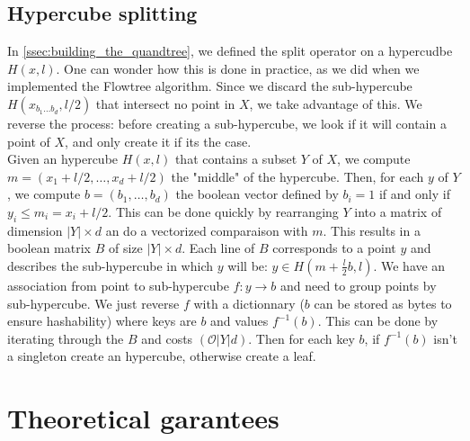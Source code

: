 \documentclass[11pt]{article}
\begin{document}
\subsection{Hypercube splitting}
In \ref{ssec:building_the_quandtree}, we defined the split operator on a hypercudbe $H(x, l)$. One can wonder how this is done in practice, as we did when we implemented the Flowtree algorithm. Since we discard the sub-hypercube $H(x_{b_1 \dots b_d}, l/2)$ that intersect no point in $X$, we take advantage of this. We reverse the process: before creating a sub-hypercube, we look if it will contain a point of $X$, and only create it if its the case.\\
Given an hypercube $H(x, l)$ that contains a subset $Y$ of $X$, we compute $m = (x_1+l/2, \dots, x_d+l/2)$ the "middle" of the hypercube. Then, for each $y$ of $Y$, we compute $b = (b_1, \dots, b_d)$ the boolean vector defined by $b_i = 1$ if and only if $y_i \leq m_i = x_i + l/2$. This can be done quickly by rearranging $Y$ into a matrix of dimension $\vert Y \vert \times d$ an do a vectorized comparaison with $m$. 
This results in a boolean matrix $B$ of size $\vert Y \vert \times d$. Each line of $B$ corresponds to a point $y$ and describes the sub-hypercube in which $y$ will be: $y \in H(m + \frac{l}{2}b, l)$.
We have an association from point to sub-hypercube $f: y \rightarrow b$ and need to group points by sub-hypercube. We just reverse $f$ with a dictionnary ($b$ can be stored as bytes to ensure hashability) where keys are $b$ and values $f^{-1}(b)$. This can be done by iterating through the $B$ and costs $(\mathcal{O}\vert Y \vert d)$. Then for each key $b$, if $f^{-1}(b)$ isn't a singleton create an hypercube, otherwise create a leaf.\\

\section{Theoretical garantees}
\end{document}
